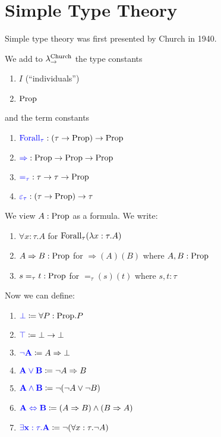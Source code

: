 \section{Simple Type Theory}

Simple type theory was first presented by Church in 1940. 

\begin{boxdefi}
    We add to $\lambda_{\to}^{\textnormal{Church}}$ the type constants 
    \begin{enumerate}
        \item \alert{$I$} (``\alert{individuals}'')
        \item \alert{$\mathrm{Prop}$}
    \end{enumerate}
    and the term constants 
    \begin{enumerate}
        \item $\alert{\forallterm{\tau}} : (\tau \to \proptype) \to \proptype$
        \item $\alert{{\Rightarrow}} : \proptype \to \proptype \to \proptype$
        \item $\alert{=_\tau} : \tau \to \tau \to \proptype$
        \item $\alert{\varepsilon_\tau} : (\tau \to \proptype) \to \tau$
    \end{enumerate}
    We view $A : \mathrm{Prop}$ as a formula. 
    We write: 
    \begin{enumerate}
        \item $\forall x : \tau. A$ for $\mathrm{Forall}_{\tau}(\lambda x : \tau.A)$
        \item $A \Rightarrow B : \mathrm{Prop}$ for ${\Rightarrow} (A)(B)$ where $A, B : \mathrm{Prop}$
        \item $s =_\tau t : \mathrm{Prop}$ for ${=_\tau}(s)(t)$ where $s, t : \tau$
    \end{enumerate}
    Now we can define: 
    \begin{enumerate}
        \item $\alert{\bot} \coloneq \forall P : \proptype. P$
        \item $\alert{\top} \coloneq \bot \to \bot$
        \item $\alert{\neg A} \coloneq A \Rightarrow \bot$
        \item $\alert{A \vee B} \coloneq \neg A \Rightarrow B$
        \item $\alert{A \wedge B} \coloneq \neg (\neg A \vee \neg B)$
        \item $\alert{A \Leftrightarrow B} \coloneq (A \Rightarrow B) \wedge (B \Rightarrow A)$
        \item $\alert{\exists x : \tau. A} \coloneq \neg (\forall x : \tau. \neg A)$
    \end{enumerate}
\end{boxdefi}

